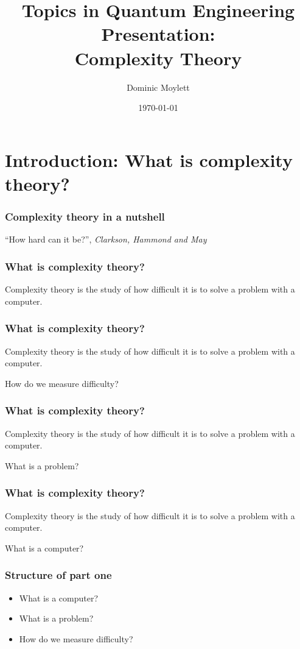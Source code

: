 \documentclass[aspectratio=169]{beamer}
\title[Complexity theory]{Topics in Quantum Engineering Presentation:\\Complexity Theory} %
\author{Dominic Moylett} %
\institute[University of Bristol] %
{
University of Bristol \\ %
\medskip
\textit{dominic.moylett@bristol.ac.uk} %
}
\date{\today} %
\begin{document}
\begin{frame}
\titlepage %
\end{frame}


\section{Introduction: What is complexity theory?}

\begin{frame}
\frametitle{Complexity theory in a nutshell}
\centerline{``How hard can it be?'', {\em Clarkson, Hammond and May}}
\end{frame}

\begin{frame}
\frametitle{What is complexity theory?}
Complexity theory is the study of how difficult it is to solve a problem with a computer.
\end{frame}

\begin{frame}
\frametitle{What is complexity theory?}
Complexity theory is the study of how {\color{red} difficult} it is to solve a problem with a computer.

How do we measure difficulty?
\end{frame}

\begin{frame}
\frametitle{What is complexity theory?}
Complexity theory is the study of how difficult it is to solve a {\color{red} problem} with a computer.

What is a problem?
\end{frame}

\begin{frame}
\frametitle{What is complexity theory?}
Complexity theory is the study of how difficult it is to solve a problem with a {\color{red} computer}.

What is a computer?
\end{frame}

\begin{frame}
\frametitle{Structure of part one}
\begin{itemize}
    \item What is a computer?
    \item What is a problem?
    \item How do we measure difficulty?
\end{itemize}
\end{frame}
\end{document}
